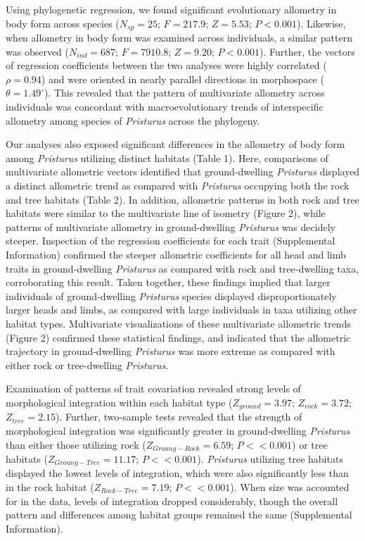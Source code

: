 \documentclass[
  11pt,
]{article}
\begin{document}
Using phylogenetic regression, we found significant evolutionary
allometry in body form across species (\(N_{sp}=25\); \(F = 217.9\);
\(Z =5.53\); \(P < 0.001\)). Likewise, when allometry in body form was
examined across individuals, a similar pattern was observed
(\(N_{ind}=687\); \(F = 7910.8\); \(Z =9.20\); \(P < 0.001\)). Further,
the vectors of regression coefficients between the two analyses were
highly correlated (\(\rho = 0.94\)) and were oriented in nearly parallel
directions in morphospace (\(\theta = 1.49^\circ\)). This revealed that
the pattern of multivariate allometry across individuals was concordant
with macroevolutionary trends of interspecific allometry among species
of \emph{Pristurus} across the phylogeny. \hfill\break

Our analyses also exposed significant differences in the allometry of
body form among \emph{Pristurus} utilizing distinct habitats (Table 1).
Here, comparisons of multivariate allometric vectors identified that
ground-dwelling \emph{Pristurus} displayed a distinct allometric trend
as compared with \emph{Pristurus} occupying both the rock and tree
habitats (Table 2). In addition, allometric patterns in both rock and
tree habitats were similar to the multivariate line of isometry (Figure
2), while patterns of multivariate allometry in ground-dwelling
\emph{Pristurus} was decidely steeper. Inspection of the regression
coefficients for each trait (Supplemental Information) confirmed the
steeper allometric coefficients for all head and limb traits in
ground-dwelling \emph{Pristurus} as compared with rock and tree-dwelling
taxa, corroborating this result. Taken together, these findings implied
that larger individuals of ground-dwelling \emph{Pristurus} species
displayed disproportionately larger heads and limbs, as compared with
large individuals in taxa utilizing other habitat types. Multivariate
visualizations of these multivariate allometric trends (Figure 2)
confirmed these statistical findings, and indicated that the allometric
trajectory in ground-dwelling \emph{Pristurus} was more extreme as
compared with either rock or tree-dwelling \emph{Pristurus}.
\hfill\break

Examination of patterns of trait covariation revealed strong levels of
morphological integration within each habitat type (\(Z_{ground}=3.97\);
\(Z_{rock}=3.72\); \(Z_{tree}=2.15\)). Further, two-sample tests
revealed that the strength of morphological integration was
significantly greater in ground-dwelling \emph{Pristurus} than either
those utilizing rock (\(Z_{Groung-Rock}=6.59\); \(P << 0.001\)) or tree
habitats (\(Z_{Groung-Tree}=11.17\); \(P << 0.001\)). \emph{Pristurus}
utilizing tree habitats displayed the lowest levels of integration,
which were also significantly less than in the rock habitat
(\(Z_{Rock-Tree}=7.19\); \(P << 0.001\)). When size was accounted for in
the data, levels of integration dropped considerably, though the overall
pattern and differences among habitat groups remained the same
(Supplemental Information). \hfill\break
\end{document}
